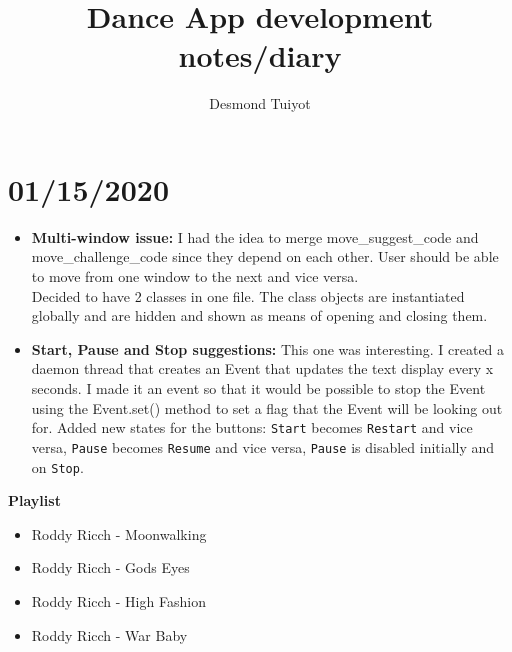 \documentclass{article}
\author{Desmond Tuiyot}
\title{Dance App development notes/diary}
\begin{document}
\maketitle
\section{01/15/2020}
\begin{itemize}
	\item \textbf{Multi-window issue:} I had the idea to merge move\_suggest\_code and move\_challenge\_code since they depend on each other. User should be able to move from one window to the next and vice versa.\\
	Decided to have 2 classes in one file. The class objects are instantiated globally and are hidden and shown as means of opening and closing them.
	\item \textbf{Start, Pause and Stop suggestions: }This one was interesting. I created a daemon thread that creates an Event that updates the text display every x seconds. I made it an event so that it would be possible to stop the Event using the Event.set() method to set a flag that the Event will be looking out for. Added new states for the buttons: \texttt{Start} becomes \texttt{Restart} and vice versa, \texttt{Pause} becomes \texttt{Resume} and vice versa, \texttt{Pause} is disabled initially and on \texttt{Stop}.    
\end{itemize}
\textbf{Playlist}
\begin{itemize}
	\item Roddy Ricch - Moonwalking
	\item Roddy Ricch - Gods Eyes
	\item Roddy Ricch - High Fashion
	\item Roddy Ricch - War Baby
\end{itemize}
\end{document}
